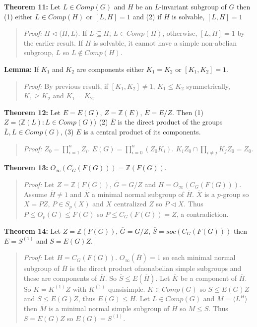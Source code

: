 {\bf Theorem 11:} Let $L \in Comp(G)$ and $H$ be an $L$-invariant subgroup of $G$ then
(1) either $L \in Comp(H)$ or $[L,H]=1$ and (2) if $H$ is solvable, $[L,H]=1$
\begin{quote}
\emph{Proof:}
$H \lhd \langle H, L \rangle$.  If $L \subseteq H$, $L \in Comp(H)$, otherwise,
$[L, H] = 1$ by the earlier result.  If $H$ is solvable, it cannot have a simple 
non-abelian subgroup, $L$ so $L \notin Comp(H)$.
\end{quote}
{\bf Lemma:} If $K_1$ and $K_2$ are components either $K_1= K_2$ or $[K_1, K_2 ] = 1$.
\begin{quote}
\emph{Proof:}
By previous result, if $[K_1 , K_2] \ne 1$, 
$K_1 \le K_2$ symmetrically,
$K_1 \ge K_2$ and $K_1 = K_2$,
\end{quote}
{\bf Theorem 12:} Let $E=E(G)$, $Z={\mathbb Z}(E)$, ${\overline E}= E/Z$.  Then
(1) $Z= \langle {\mathbb Z}(L): L \in Comp(G) \rangle $
(2) ${\overline E}$ is the direct product of the groups ${\overline L}, L \in Comp(G)$,
(3) $E$ is a central product of its components.
\begin{quote}
\emph{Proof:}
$Z_0 = \prod_{i=1}^n Z_i$.  $E(G)= \prod_{i=0}^n (Z_0 K_i)$.  
$K_i Z_0 \cap \prod_{i \ne j} K_j Z_0 = Z_0$.
\end{quote}
{\bf Theorem 13:} $O_{\infty}(C_G(F(G)))= {\mathbb Z}(F(G))$.
\begin{quote}
\emph{Proof:}
Let $Z={\mathbb Z}(F(G))$, ${\overline G}= G/Z$ and $H=O_{\infty}(C_G(F(G)))$.
Assume ${\overline H} \ne 1$ and ${\overline X}$ a minimal normal subgroup of
${\overline H}$.  ${\overline X}$ is a $p$-group so $X=PZ$, $P \in S_p(X)$ and $X$
centralized $Z$ so $P \lhd X$.  Thus $P \le O_p(G) \le F(G)$ so $P \le C_G(F(G))=Z$,
a contradiction.
\end{quote}
{\bf Theorem 14:} Let $Z={\mathbb Z}(F(G))$, ${\overline G}= G/Z$, ${\overline S}= soc(C_G(F(G)))$
then $E= S^{(1)}$ and $S=E(G)Z$.
\begin{quote}
\emph{Proof:}
Let $H=C_G(F(G))$.  $O_{\infty}({\overline H}) = 1$ so each minimal normal subgroup
of ${\overline H}$ is the direct product ofnonabelian simple subgroups and these are
components of ${\overline H}$.  So ${\overline S} \le E({\overline H})$.
Let ${\overline K}$ be a component of ${\overline H}$.  So $K= K^{(1)}Z$ with
$K^{(1)}$ quasisimple.  $K \in Comp(G)$ so
$S \le E(G)Z$ and $S \le E(G)Z$, thus $E(G) \le H$.  
Let $L \in Comp(G)$ and $M= \langle L^H \rangle $
then ${\overline M}$ is a minimal normal simple subgroup of ${\overline H}$ so
$M \le S$.  Thus $S=E(G)Z$ so $E(G)=S^{(1)}$.
\end{quote}
